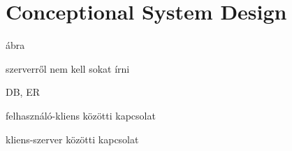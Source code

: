 \chapter{Conceptional System Design}
ábra

szerverről nem kell sokat írni

DB, ER

felhasználó-kliens közötti kapcsolat

kliens-szerver közötti kapcsolat